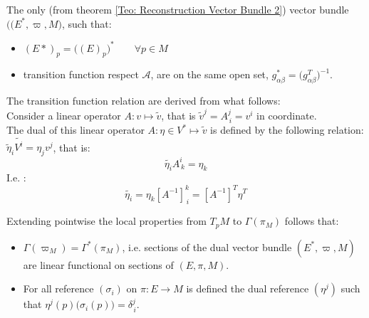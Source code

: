 \documentclass[a4paper,12pt]{scrartcl}    %
\begin{document}
\begin{definition}\label{Def: Dual vector bundle}
	The only (from theorem \ref{Teo: Reconstruction Vector Bundle 2}) vector bundle $\big( (E^*, \varpi,M \big)$, such that:
	\begin{itemize}
		\item $(E* ) _p = \big(( E)_p \big) ^* \qquad \forall p \in M$
		\item transition function respect $\mathcal{A}$, are on the same open set, $g^*_{\alpha \beta} =\big( g_{\alpha	\beta}^T \big)^{-1}$.
	\end{itemize}
\end{definition}
\begin{observation}
	The transition function relation are derived from what follows:
	\\
	Consider a linear operator $ A: v \mapsto\tilde{v}$, that is $\tilde{v}^j = A^j_{\, i} = v^i$  in coordinate.
	\\
	The dual of this linear operator $ A : \eta \in V^* \mapsto \tilde{v}$ is defined by the following relation: $\tilde{\eta}_i \tilde{V^i} = \eta_j v^j $, that is:
	\begin{displaymath}
		\tilde{\eta_i} A^i_{\, k} = \eta_k
	\end{displaymath}
	I.e. :
	\begin{displaymath}
		\tilde{\eta_i}= \eta_k [A^{-1} ]^k_{\, i} =[A^{-1} ]^T \eta^T
	\end{displaymath}
\end{observation}

\begin{observation}
Extending pointwise the local properties from $T_pM$ to $\Gamma(\pi_M)$ follows that:
	\begin{itemize}
		\item $\Gamma(\varpi_M) = \Gamma^*(\pi_M)$, i.e. sections of the dual vector bundle $(E^*, \varpi, M)$ are linear functional on sections of $(E, \pi, M)$.
		\item For all reference $(\sigma_i)$ on $\pi:E\rightarrow M$ is defined the dual reference $(\eta^j)$ such that $ \eta^j(p) \big(\sigma_i(p)\big)= \delta^j_{\, i}$.
	\end{itemize}
\end{observation}



\newpage
\end{document}
